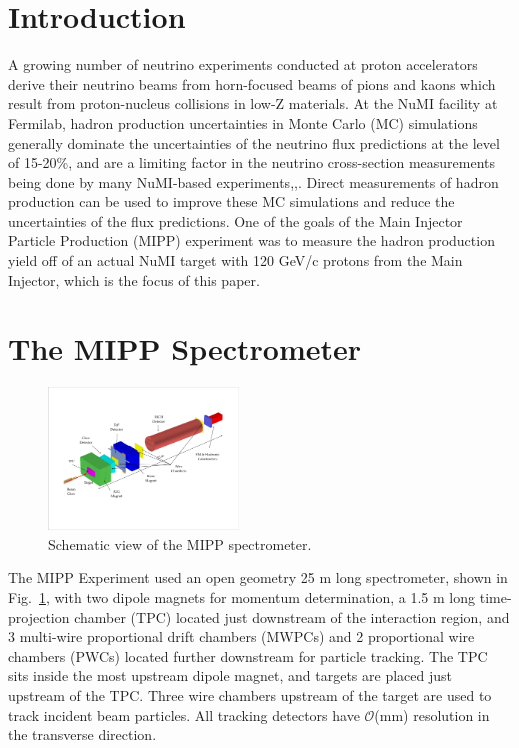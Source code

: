 \documentclass[%
aps, prd, reprint, show pacs, preprint numbers, ams math, amssymb, superscriptaddress, linenumbers]{revtex4-1}
\begin{document}
\section{Introduction}
A growing number of neutrino experiments conducted at proton accelerators derive their neutrino beams from 
horn-focused beams of pions and kaons which result from proton-nucleus collisions in low-Z materials.  At the 
NuMI facility at Fermilab, hadron production uncertainties in Monte Carlo (MC) simulations generally dominate 
the uncertainties of the neutrino flux predictions at the level of 15-20\%, and are a limiting factor in the neutrino 
cross-section measurements being done by many NuMI-based experiments\cite{ref:MINOS},\cite{ref:MINERvA1},\cite{ref:MINERvA2}.  
Direct measurements of hadron production can be used to improve these MC simulations and reduce the 
uncertainties of the flux predictions.  One of the goals of the Main Injector Particle Production (MIPP) experiment 
was to measure the hadron production yield off of an actual NuMI target with 120 GeV/c protons from 
the Main Injector, which is the focus of this paper.  


\section{The MIPP Spectrometer}

\begin{figure}[tpb]
   \centering
   \includegraphics[width=0.45\textwidth]{MIPPSpectrometer}
   \caption{Schematic view of the MIPP spectrometer.}
   \label{fig:MIPPSpect}
\end{figure}

The MIPP Experiment used an open geometry 25 m long spectrometer, shown in Fig.~\ref{fig:MIPPSpect}, with two dipole magnets for momentum determination, a 1.5 m long time-projection chamber (TPC) located just downstream of the interaction region, and 3 multi-wire proportional drift chambers (MWPCs) and 2 proportional wire chambers (PWCs) located further downstream for particle tracking.  The TPC sits inside the most upstream dipole magnet, and targets are placed just upstream of the TPC.  Three wire chambers upstream of the target are used to track incident beam particles.  All tracking detectors have $\mathcal{O}$(mm) resolution in the transverse direction.  
\end{document}
